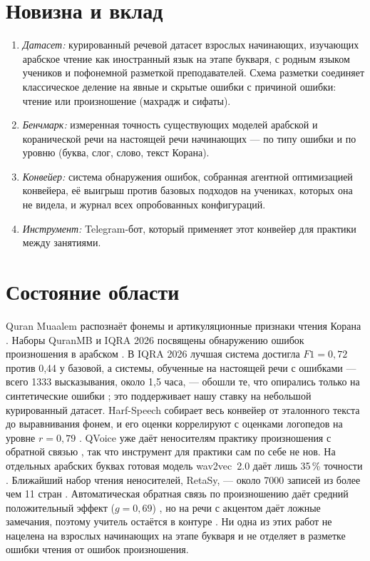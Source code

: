 \documentclass[a4paper,14pt]{extarticle}
\begin{document}
\section{Новизна и вклад}

\begin{enumerate}
  \item \emph{Датасет:} курированный речевой датасет взрослых начинающих, изучающих арабское чтение как
    иностранный язык на этапе букваря, с родным языком учеников и пофонемной разметкой преподавателей. Схема
    разметки соединяет классическое деление на явные и скрытые ошибки с причиной ошибки: чтение или
    произношение (махрадж и сифаты).
  \item \emph{Бенчмарк:} измеренная точность существующих моделей арабской и коранической речи на настоящей
    речи начинающих --- по типу ошибки и по уровню (буква, слог, слово, текст Корана).
  \item \emph{Конвейер:} система обнаружения ошибок, собранная агентной оптимизацией конвейера, её выигрыш
    против базовых подходов на учениках, которых она не видела, и журнал всех опробованных конфигураций.
  \item \emph{Инструмент:} Telegram-бот, который применяет этот конвейер для практики между занятиями.
\end{enumerate}

\section{Состояние области}

Quran Muaalem распознаёт фонемы и артикуляционные признаки чтения Корана \cite{SRC-002}. Наборы QuranMB и
IQRA 2026 посвящены обнаружению ошибок произношения в арабском \cite{SRC-004,SRC-031}. В IQRA 2026 лучшая
система достигла $F1=0{,}72$ против 0,44 у базовой, а системы, обученные на настоящей речи с ошибками ---
всего 1333 высказывания, около 1,5 часа, --- обошли те, что опирались только на синтетические ошибки
\cite{SRC-031}; это поддерживает нашу ставку на небольшой курированный датасет. Harf-Speech собирает весь
конвейер от эталонного текста до выравнивания фонем, и его оценки коррелируют с оценками логопедов на
уровне $r=0{,}79$ \cite{SRC-149}. QVoice уже даёт неносителям практику произношения с обратной связью
\cite{SRC-150}, так что инструмент для практики сам по себе не нов. На отдельных арабских буквах готовая
модель wav2vec~2.0 даёт лишь 35\,\% точности \cite{SRC-151}. Ближайший набор чтения неносителей, RetaSy,
--- около 7000 записей из более чем 11 стран \cite{SRC-032}. Автоматическая обратная связь по произношению
даёт средний положительный эффект ($g=0{,}69$) \cite{SRC-025}, но на речи с акцентом даёт ложные замечания,
поэтому учитель остаётся в контуре \cite{SRC-026}. Ни одна из этих работ не нацелена на взрослых
начинающих на этапе букваря и не отделяет в разметке ошибки чтения от ошибок произношения.
\end{document}
